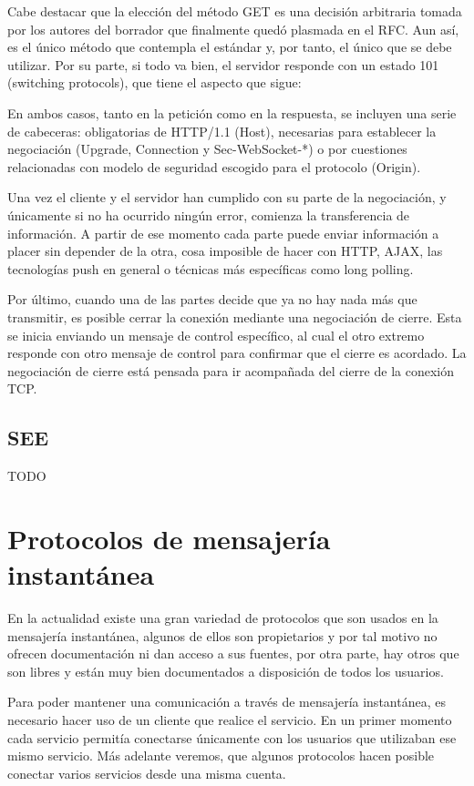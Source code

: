 Cabe destacar que la elección del método GET es una decisión arbitraria tomada por los autores del borrador que finalmente quedó plasmada en el RFC. Aun así, es el único método que contempla el estándar y, por tanto, el único que se debe utilizar. Por su parte, si todo va bien, el servidor responde con un estado 101 (switching protocols), que tiene el aspecto que sigue:

En ambos casos, tanto en la petición como en la respuesta, se incluyen una serie de cabeceras: obligatorias de HTTP/1.1 (Host), necesarias para establecer la negociación (Upgrade, Connection y Sec-WebSocket-*) o por cuestiones relacionadas con modelo de seguridad escogido para el protocolo (Origin).

Una vez el cliente y el servidor han cumplido con su parte de la negociación, y únicamente si no ha ocurrido ningún error, comienza la transferencia de información. A partir de ese momento cada parte puede enviar información a placer sin depender de la otra, cosa imposible de hacer con HTTP, AJAX, las tecnologías push en general o técnicas más específicas como long polling.

Por último, cuando una de las partes decide que ya no hay nada más que transmitir, es posible cerrar la conexión mediante una negociación de cierre. Esta se inicia enviando un mensaje de control específico, al cual el otro extremo responde con otro mensaje de control para confirmar que el cierre es acordado. La negociación de cierre está pensada para ir acompañada del cierre de la conexión TCP.

\subsection{SEE}

TODO

\clearpage

\section{Protocolos de mensajería instantánea}

En la actualidad existe una gran variedad de protocolos que son usados en la mensajería instantánea, algunos de ellos son propietarios y por tal motivo no ofrecen documentación ni dan acceso a sus fuentes, por otra parte, hay otros que son libres y están muy bien documentados a disposición de todos los usuarios.

Para poder mantener una comunicación a través de mensajería instantánea, es necesario hacer uso de un cliente que realice el servicio. En un primer momento cada servicio permitía conectarse únicamente con los usuarios que utilizaban ese mismo servicio. Más adelante veremos, que algunos protocolos hacen posible conectar varios servicios desde una misma cuenta.

